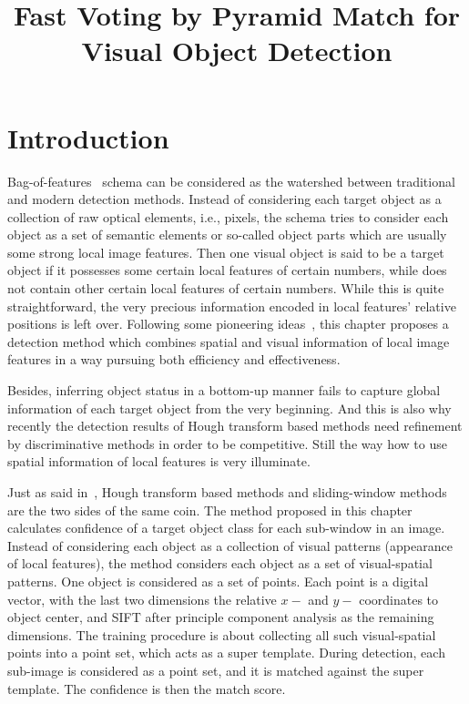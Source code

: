 \documentclass[paper]{ieice}
\title{Fast Voting by Pyramid Match for Visual Object Detection}
\begin{document}
\maketitle
\begin{summary}

\end{summary}
\begin{keywords}

\end{keywords}

\section{Introduction}

Bag-of-features~\cite{obof,bgf} schema can be considered as the watershed between traditional and modern detection methods. Instead of considering each target object as a collection of raw optical elements, i.e., pixels, the schema tries to consider each object as a set of semantic elements or so-called object parts which are usually some strong local image features. Then one visual object is said to be a target object if it possesses some certain local features of certain numbers, while does not contain other certain local features of certain numbers. While this is quite straightforward, the very precious information encoded in local features' relative positions is left over. Following some pioneering ideas~\cite{spmk,ac30}, this chapter proposes a detection method which combines spatial and visual information of local image features in a  way pursuing both efficiency and effectiveness.


 Besides, inferring object status in a bottom-up manner fails to capture global information of each target object from the very beginning. And this is also why recently the detection results of Hough transform based methods need refinement by discriminative methods in order to be competitive. Still the way how to use spatial information of local features is very illuminate.

 Just as said in~\cite{ac27}, Hough transform based methods and sliding-window methods are the two sides of the same coin. The method proposed in this chapter calculates confidence of a target object class for each sub-window in an image. Instead of considering each object as a collection of visual patterns (appearance of local features), the method considers each object as a set of visual-spatial patterns. One object is considered as a set of points. Each point is a digital vector, with the last two dimensions the relative $x-$ and $y-$ coordinates to object center, and SIFT after principle component analysis as the remaining dimensions. The training procedure is about collecting all such visual-spatial points into a point set, which acts as a super template. During detection, each sub-image is considered as a point set, and it is matched against the super template. The confidence is then the match score.
\end{document}

